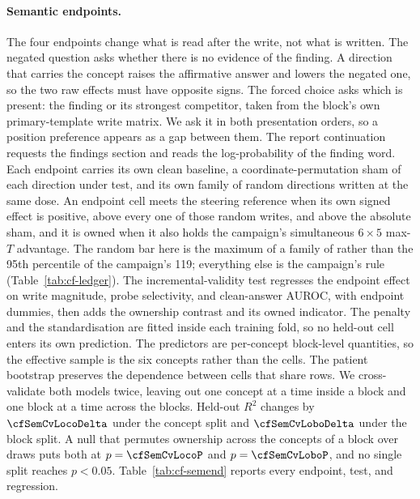 \documentclass{article}
\begin{document}
\paragraph{Semantic endpoints.} The four endpoints change what is read after the write, not what is written. The negated question asks whether there is no evidence of the finding. A direction that carries the concept raises the affirmative answer and lowers the negated one, so the two raw effects must have opposite signs. The forced choice asks which is present: the finding or its strongest competitor, taken from the block's own primary-template write matrix. We ask it in both presentation orders, so a position preference appears as a gap between them. The report continuation requests the findings section and reads the log-probability of the finding word. Each endpoint carries its own clean baseline, a coordinate-permutation sham of each direction under test, and its own family of \cfSemLedgerRandom{} random directions written at the same dose. An endpoint cell meets the steering reference when its own signed effect is positive, above every one of those \cfSemLedgerRandom{} random writes, and above the absolute sham, and it is owned when it also holds the campaign's simultaneous $6\times5$ max-$T$ advantage. The random bar here is the maximum of a family of \cfSemLedgerRandom{} rather than the 95th percentile of the campaign's 119; everything else is the campaign's rule (Table~\ref{tab:cf-ledger}). The incremental-validity test regresses the endpoint effect on write magnitude, probe selectivity, and clean-answer AUROC, with endpoint dummies, then adds the ownership contrast and its owned indicator. The penalty and the standardisation are fitted inside each training fold, so no held-out cell enters its own prediction. The predictors are per-concept block-level quantities, so the effective sample is the six concepts rather than the cells. The patient bootstrap preserves the dependence between cells that share rows. We cross-validate both models twice, leaving out one concept at a time inside a block and one block at a time across the \cfSemCvBlocks{} blocks. Held-out $R^2$ changes by $\cfSemCvLocoDelta$ under the concept split and $\cfSemCvLoboDelta$ under the block split. A null that permutes ownership across the concepts of a block over \cfSemCvPerms{} draws puts both at $p=\cfSemCvLocoP$ and $p=\cfSemCvLoboP$, and no single split reaches $p<0.05$. Table~\ref{tab:cf-semend} reports every endpoint, test, and regression.
\end{document}
